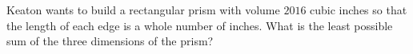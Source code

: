 Keaton wants to build a rectangular prism with volume $2016$ cubic inches so that the length of each edge is a whole number of inches. What is the least possible sum of the three dimensions of the prism?
